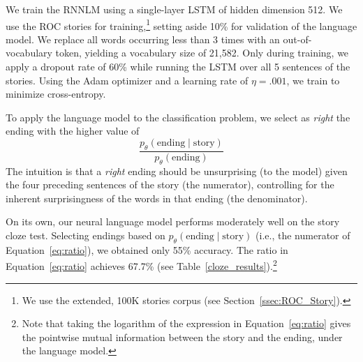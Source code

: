 \documentclass[11pt,a4paper]{article}
\newcommand{\secref}[1]{Section~\ref{ssec:#1}}
\newcommand{\tabref}[1]{Table~\ref{#1}}
\newcommand{\resolved}[1]{}
\newcommand{\roy}[1]{{\color{orange}\textsc{[#1 --rs]}}}
\newcommand{\nascomment}[1]{{\color{blue}\textsc{[#1 --nas]}}}
\renewcommand{\roy}[1]{{\color{orange}[#1 --rs]}}
\renewcommand{\roy}[1]{#1}
\renewcommand{\nascomment}[1]{}
\begin{document}
We train the RNNLM using a single-layer LSTM of hidden dimension 512.
We use the ROC stories for training,\footnote{We use the extended, 100K stories corpus (see \secref{ROC_Story}).} setting aside 10\% for validation of the language model. 
We replace all words occurring less than 3 times with an 
out-of-vocabulary token, yielding a vocabulary size of  21,582.
Only during training, we apply a dropout rate of 60\% while running the LSTM over all 5 sentences of the stories. 
Using the Adam optimizer \cite{kingma2014adam} and a learning rate of
$\eta=.001$, we train to minimize cross-entropy. %

To apply the language model to the classification problem, we select
as \emph{right} the ending with the higher value of
\begin{equation}
\frac{p_\theta(\textrm{ending} \mid
  \textrm{story})}{p_\theta(\textrm{ending})} \label{eq:ratio}
\end{equation}
The intuition is that a \emph{right} ending should be unsurprising (to
the model)
given the four preceding sentences of the story (the numerator), controlling for the
inherent surprisingness of the words in that ending (the denominator).

\resolved{\nascomment{please check the paragraph above.  we need to say how we
  use the LM before we evaluate it!  also, has anyone tried an approach like this
  before?  even if we aren't exactly replicating another paper, if
  someone else used RNNs for this task, we should credit them.}
  \roy{Ours is the first work to publish LSTM results on this dataset.}}

On its own, our neural language model performs moderately well on the story cloze test. 
Selecting endings based on $p_\theta(\textrm{ending} \mid \textrm{story})$ (i.e., the numerator of
Equation~\ref{eq:ratio}), we obtained only 55\% accuracy.   The ratio
in Equation~\ref{eq:ratio} achieves 67.7\%  (see
\tabref{cloze_results}).\footnote{Note that taking the logarithm of
  the expression in Equation~\ref{eq:ratio} gives the pointwise mutual
information between the story and the ending, under the language
model.\nascomment{added this to replace the hedging that was here before}\resolved{\roy{We actually also use the RNNLM features in log space. Add that in the next paragraph.}}}
\end{document}
